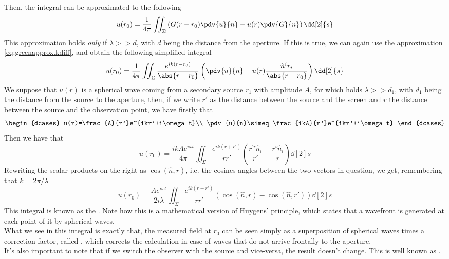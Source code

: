 \documentclass[../electromagnetism.tex]{subfiles}
\begin{document}
Then, the integral can be approximated to the following
\begin{equation}
	u(r_0)=\frac{1}{4\pi}\iint_{\Sigma}\left( G(r-r_0)\pdv{u}{n}-u(r)\pdv{G}{n} \right)\dd[2]{s}
	\label{eq:kirchhapprox.kdiff}
\end{equation}
This approximation holds \textit{only} if $\lambda>>d$, with $d$ being the distance from the aperture. If this is true, we can again use the approximation \eqref{eq:greenapprox.kdiff}, and obtain the following simplified integral
\begin{equation*}
	u(r_0)=\frac{1}{4\pi}\iint_{\Sigma}\frac{e^{ik(r-r_0)}}{\abs{r-r_0}}\left( \pdv{u}{n}-u(r)\frac{\hat{n}^ir_i}{\abs{r-r_0}} \right)\dd[2]{s}
\end{equation*}
We suppose that $u(r)$ is a spherical wave coming from a secondary source $r_1$ with amplitude $A$, for which holds $\lambda>>d_1$, with $d_1$ being the distance from the source to the aperture, then, if we write $r'$ as the distance between the source and the screen and $r$ the distance between the source and the observation point, we have firstly that
\begin{equation*}
	\begin{dcases}
		u(r)=\frac{A}{r'}e^{ikr'+i\omega t}\\
		\pdv{u}{n}\simeq\frac{ikA}{r'}e^{ikr'+i\omega t}
	\end{dcases}
\end{equation*}
Then we have that
\begin{equation*}
	u(r_0)=\frac{ikAe^{i\omega t}}{4\pi}\iint_{\Sigma}\frac{e^{ik(r+r')}}{rr'}\left( \frac{r^{'i}\hat{n}_i}{r'}-\frac{r^i\hat{n}_i}{r} \right)\dd[2]{s}
\end{equation*}
Rewriting the scalar products on the right as $\cos(\hat{n},r)$, i.e. the cosines angles between the two vectors in question, we get, remembering that $k=2\pi/\lambda$
\begin{equation}
	u(r_0)=\frac{Ae^{i\omega t}}{2i\lambda}\iint_\Sigma \frac{e^{ik(r+r')}}{rr'}\left( \cos(\hat{n},r)-\cos(\hat{n},r') \right)\dd[2]{s}
	\label{eq:fresnelkirchhoff.diff}
\end{equation}
This integral is known as the . Note how this is a mathematical version of Huygens' principle, which states that a wavefront is generated at each point of it by spherical waves.\\
What we see in this integral is exactly that, the measured field at $r_0$ can be seen simply as a superposition of spherical waves times a correction factor, called , which corrects the calculation in case of waves that do not arrive frontally to the aperture.\\
It's also important to note that if we switch the observer with the source and vice-versa, the result doesn't change. This is well known as .
\end{document}
